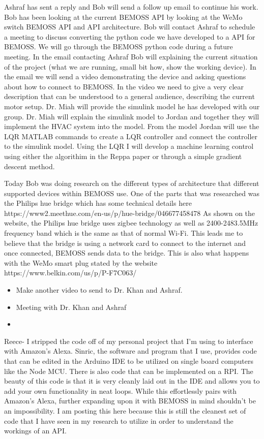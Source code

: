 \documentclass[fontsize=11pt, %
                             paper=letter, %
                             twoside, %
                             captions=tableheading,
                             index=totoc,
                             hyperref]{labbook}
\begin{document}
Ashraf has sent a reply and Bob will send a follow up email to continue his work. Bob has been looking at the current BEMOSS API by looking at the WeMo switch BEMOSS API and API architecture. Bob will contact Ashraf to schedule a meeting to discuss converting the python code we have developed to a API for BEMOSS. We will go through the BEMOSS python code during a future meeting. In the email contacting Ashraf Bob will explaining the current situation of the project (what we are running, small bit how, show the working device). In the email we will send a video demonstrating the device and asking questions about how to connect to BEMOSS. In the video we need to give a very clear description that can be understood to a general audience, describing the current motor setup.
\newline
Dr. Miah will provide the simulink model he has developed with our group. Dr. Miah will explain the simulink model to Jordan and together they will implement the HVAC system into the model. From the model Jordan will use the LQR MATLAB commands to create a LQR controller and connect the controller to the simulink model. Using the LQR I will develop a machine learning control using either the algorithim in the Reppa paper or through a simple gradient descent method.

Today Bob was doing research on the different types of architecture that different supported devices within BEMOSS use. One of the parts that was researched was the Philips hue bridge which has some technical details here https://www2.meethue.com/en-us/p/hue-bridge/046677458478
As shown on the website, the Philips hue bridge uses zigbee technology as well as 2400-2483.5MHz frequency band which is the same as that of normal Wi-Fi. This leads me to believe that the bridge is using a network card to connect to the internet and once connected, BEMOSS sends data to the bridge. This is also what happens with the WeMo smart plug stated by the website
https://www.belkin.com/us/p/P-F7C063/

\begin{itemize}
    \item Make another video to send to Dr. Khan and Ashraf.
    \item Meeting with Dr. Khan and Ashraf
    \item 
\end{itemize}

Reece- I stripped the code off of my personal project that I'm using to interface with Amazon's Alexa. Sinric, the software and program that I use, provides code that can be edited in the Arduino IDE to be utilized on single board computers like the Node MCU. There is also code that can be implemented on a RPI. The beauty of this code is that it is very cleanly laid out in the IDE and allows you to add your own functionality in neat loops. While this effortlessly pairs with Amazon's Alexa, further expanding upon it with BEMOSS in mind shouldn't be an impossibility. I am posting this here because this is still the cleanest set of code that I have seen in my research to utilize in order to understand the workings of an API. 
\end{document}
